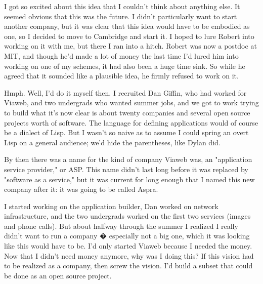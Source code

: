 I got so excited about this idea
                  that I couldn't think about anything else. It seemed obvious
                  that this was the future. I didn't particularly want to start
                  another company, but it was clear that this idea would have to
                  be embodied as one, so I decided to move to Cambridge and
                  start it. I hoped to lure Robert into working on it with me,
                  but there I ran into a hitch. Robert was now a postdoc at MIT,
                  and though he'd made a lot of money the last time I'd lured
                  him into working on one of my schemes, it had also been a huge
                  time sink. So while he agreed that it sounded like a plausible
                  idea, he firmly refused to work on it.

Hmph. Well,
                  I'd do it myself then. I recruited Dan Giffin, who had worked
                  for Viaweb, and two undergrads who wanted summer jobs, and we
                  got to work trying to build what it's now clear is about
                  twenty companies and several open source projects worth of
                  software. The language for defining applications would of
                  course be a dialect of Lisp. But I wasn't so naive as to
                  assume I could spring an overt Lisp on a general audience;
                  we'd hide the parentheses, like Dylan did.

By then
                  there was a name for the kind of company Viaweb was, an
                  "application service provider," or ASP. This name didn't last
                  long before it was replaced by "software as a service," but it
                  was current for long enough that I named this new company
                  after it: it was going to be called Aspra.

I
                  started working on the application builder, Dan worked on
                  network infrastructure, and the two undergrads worked on the
                  first two services (images and phone calls). But about halfway
                  through the summer I realized I really didn't want to run a
                  company � especially not a big one, which it was looking like
                  this would have to be. I'd only started Viaweb because I
                  needed the money. Now that I didn't need money anymore, why
                  was I doing this? If this vision had to be realized as a
                  company, then screw the vision. I'd build a subset that could
                  be done as an open source project.

